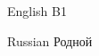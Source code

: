 
\begin{cvskills}

  \cvskill
    {English} %
    {B1} %

  \cvskill
    {Russian} %
    {Родной} %

\end{cvskills}
